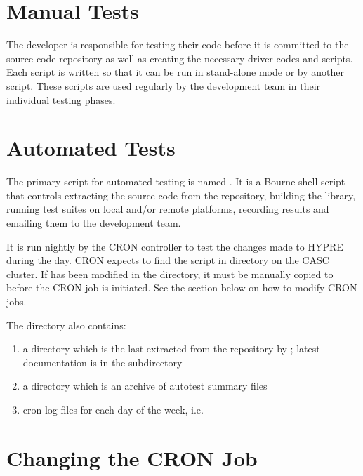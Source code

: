 \section{Manual Tests}
\label{Manual Tests}

The developer is responsible for testing their code before it is committed to the
source code repository as well as creating the necessary driver codes and scripts.
Each script is written so that it can be run in stand-alone mode or by another 
script.  These scripts are used regularly by the development team in their individual
testing phases.

\section{Automated Tests}
\label{Automated Tests}

The primary script for automated testing is named .  It is a Bourne 
shell script that controls extracting the source code from the repository, building 
the library, running test suites on local and/or remote platforms, recording results 
and emailing them to the development team. 

It is run nightly by the CRON controller to test the changes made to HYPRE during 
the day.  CRON expects to find the script in 
directory on the CASC cluster. If  has been modified in the 
directory, it must be manually copied to  
before the CRON job is initiated.  See the section below on how to modify CRON jobs.

The  directory also contains:
\begin{enumerate}
\item a  directory which is the last extracted from the repository
by ; latest documentation is in the  subdirectory
\item a  directory which is an archive of autotest summary files
\item cron log files for each day of the week, i.e. 
\end{enumerate}

\section{Changing the CRON Job}
\label{Changing the CRON Job}

